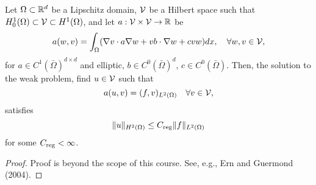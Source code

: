 \begin{lemma}
  \label{lemma:th_elliptic_reg}
  Let $\Omega \subset \mathbb{R}^d$ be a Lipschitz domain, $\mathcal{V}$ be a Hilbert space such that $H_0^1(\Omega) \subset \mathcal{V} \subset H^1(\Omega)$, and let $a: \mathcal{V} \times \mathcal{V} \to \mathbb{R}$ be
  \begin{equation*}
    a(w,v) = \int_\Omega (\nabla v \cdot a \nabla w + v b \cdot \nabla w + c v w) dx,  \quad \forall w, v \in \mathcal{V},
  \end{equation*}
  for $a \in C^{1}(\bar \Omega)^{d \times d}$ and elliptic, $b \in C^0(\bar \Omega)^d$, $c \in C^0(\bar \Omega)$.  Then, the solution to the weak problem, find $u \in \mathcal{V}$ such that
  \begin{equation*}
    a(u,v) = (f,v)_{L^2(\Omega)} \quad \forall v \in \mathcal{V},
  \end{equation*}
  satisfies
  \begin{equation*}
    \| u \|_{H^2(\Omega)} \leq C_{\rm reg} \| f \|_{L^2(\Omega)}
  \end{equation*}
  for some $C_{\rm reg} < \infty$.
  \begin{proof}
    Proof is beyond the scope of this course.  See, e.g., Ern and Guermond (2004). %
  \end{proof}
\end{lemma}
